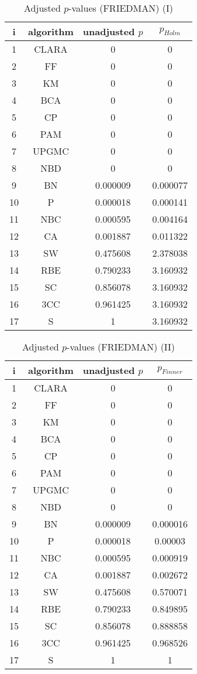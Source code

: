 \documentclass[a4paper,10pt]{article}
\begin{document}
\begin{landscape}
\begin{table}[!htp]
\centering\small
\begin{tabular}{cccc}
i&algorithm&unadjusted $p$&$p_{Holm}$\\
\hline1&CLARA&0&0\\2&FF&0&0\\3&KM&0&0\\4&BCA&0&0\\5&CP&0&0\\6&PAM&0&0\\7&UPGMC&0&0\\8&NBD&0&0\\9&BN&0.000009&0.000077\\10&P&0.000018&0.000141\\11&NBC&0.000595&0.004164\\12&CA&0.001887&0.011322\\13&SW&0.475608&2.378038\\14&RBE&0.790233&3.160932\\15&SC&0.856078&3.160932\\16&3CC&0.961425&3.160932\\17&S&1&3.160932\\\hline
\end{tabular}
\caption{Adjusted $p$-values (FRIEDMAN) (I)}
\end{table}
\begin{table}[!htp]
\centering\small
\begin{tabular}{cccc}
i&algorithm&unadjusted $p$&$p_{Finner}$\\
\hline1&CLARA&0&0\\2&FF&0&0\\3&KM&0&0\\4&BCA&0&0\\5&CP&0&0\\6&PAM&0&0\\7&UPGMC&0&0\\8&NBD&0&0\\9&BN&0.000009&0.000016\\10&P&0.000018&0.00003\\11&NBC&0.000595&0.000919\\12&CA&0.001887&0.002672\\13&SW&0.475608&0.570071\\14&RBE&0.790233&0.849895\\15&SC&0.856078&0.888858\\16&3CC&0.961425&0.968526\\17&S&1&1\\\hline
\end{tabular}
\caption{Adjusted $p$-values (FRIEDMAN) (II)}
\end{table}

\newpage
\end{landscape}
\end{document}
